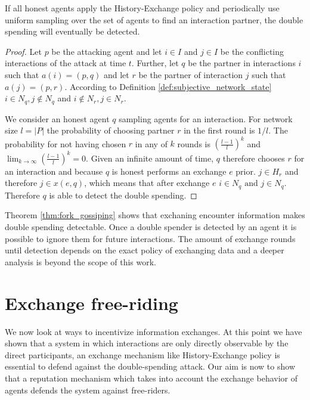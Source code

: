 \begin{thm}
    \label{thm:fork_gossiping}
    If all honest agents apply the History-Exchange policy and periodically use uniform sampling over
    the set of agents to find an interaction partner, the double spending will eventually be detected.
\end{thm}
\begin{proof}
    Let $p$ be the attacking agent and let $i \in I$ and $j \in I$ be the conflicting interactions 
    of the attack at time $t$. Further, let $q$ be the partner in interactions $i$ such that 
    $a(i) = (p, q)$ and let $r$ be the partner of interaction $j$ such that $a(j) = (p, r)$. 
    According to Definition \ref{def:subjective_network_state} $i \in N_{q}, j \notin N_{q}$ and 
    $i \notin N_{r}, j \in N_{r}$.

    We consider an honest agent $q$ sampling agents for an interaction. For network size $l = |P|$ the 
    probability of choosing partner $r$ in the first round is $1/l$. The probability for not having
    chosen $r$ in any of $k$ rounds is $(\frac{l-1}{l})^k$ and $\lim_{k\to\infty}(\frac{l-1}{l})^k = 0$.
    Given an infinite amount of time, $q$ therefore chooses $r$ for an interaction and because $q$ is honest 
    performs an 
    exchange $e$ prior. $j \in H_r$ and therefore $j \in x(e, q)$, which means that after exchange 
    $e$ $i \in N_q \text{ and } j \in N_q$. Therefore $q$ is able to detect the double spending.
\end{proof}

Theorem \ref{thm:fork_gossiping} shows that exchaning encounter information makes double spending detectable. Once a double
spender is detected by an agent it is possible to ignore them for future interactions. The amount 
of exchange rounds until detection depends on the exact policy of exchanging data and a deeper 
analysis is beyond the scope of this work.

\section{Exchange free-riding}
We now look at ways to incentivize information exchanges. At this point we have shown that a system in which 
interactions are only directly observable by the direct participants, an exchange mechanism like 
History-Exchange policy is essential to defend against the double-spending attack. 
Our aim is now to show that a reputation mechanism which takes into account the exchange behavior of 
agents defends the system against free-riders. 

